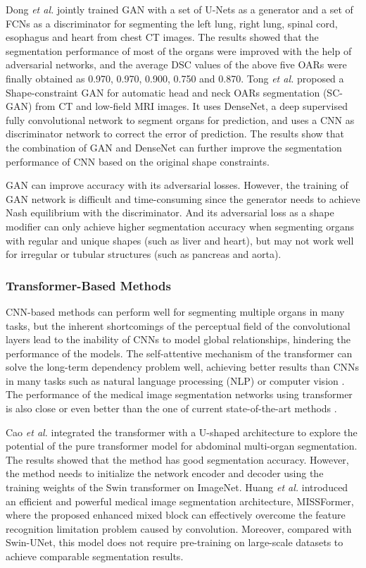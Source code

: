 \documentclass[lettersize,journal]{IEEEtran}
\begin{document}
Dong {\it{et al.}} \cite{84} jointly trained GAN with a set of U-Nets as a generator and a set of FCNs as a discriminator for segmenting the left lung, right lung, spinal cord, esophagus and heart from chest CT images. The results showed that the segmentation performance of most of the organs were improved with the help of adversarial networks, and the average DSC values of the above five OARs were finally obtained as 0.970, 0.970, 0.900, 0.750 and 0.870. Tong {\it{et al.}} \cite{41} proposed a Shape-constraint GAN for automatic head and neck OARs segmentation (SC-GAN) from CT and low-field MRI images. It uses DenseNet, a deep supervised fully convolutional network to segment organs for prediction, and uses a CNN as discriminator network to correct the error of prediction. The results show that the combination of GAN and DenseNet can further improve the segmentation performance of CNN based on the original shape constraints.

GAN can improve accuracy with its adversarial losses. However, the training of GAN network is difficult and time-consuming since the generator needs to achieve Nash equilibrium with the discriminator. And its adversarial loss as a shape modifier can only achieve higher segmentation accuracy when segmenting organs with regular and unique shapes (such as liver and heart), but may not work well for irregular or tubular structures (such as pancreas and aorta).

\subsubsection{Transformer-Based Methods}
CNN-based methods can perform well for segmenting multiple organs in many tasks, but the inherent shortcomings of the perceptual field of the convolutional layers lead to the inability of CNNs to model global relationships, hindering the performance of the models. The self-attentive mechanism of the transformer \cite{110} can solve the long-term dependency problem well, achieving better results than CNNs in many tasks such as natural language processing (NLP) or computer vision \cite{111}. The performance of the medical image segmentation networks using transformer is also close or even better than the one of current state-of-the-art methods \cite{112,113,114,115}.

Cao {\it{et al.}} \cite{71} integrated the transformer with a U-shaped architecture to explore the potential of the pure transformer model for abdominal multi-organ segmentation. The results showed that the method has good segmentation accuracy. However, the method needs to initialize the network encoder and decoder using the training weights of the Swin transformer on ImageNet. Huang {\it{et al.}} \cite{75} introduced an efficient and powerful medical image segmentation architecture, MISSFormer, where the proposed enhanced mixed block can effectively overcome the feature recognition limitation problem caused by convolution. Moreover, compared with Swin-UNet, this model does not require pre-training on large-scale datasets to achieve comparable segmentation results.
\end{document}
